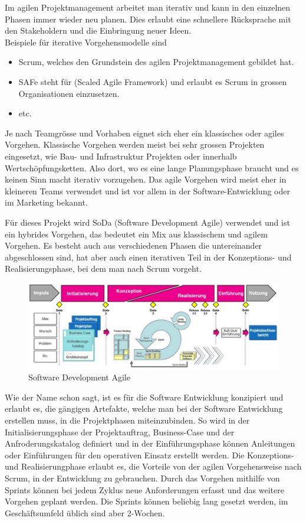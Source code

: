 \documentclass[a4paper, table]{article}
\begin{document}
Im agilen Projektmanagement arbeitet man iterativ und kann in den einzelnen Phasen immer wieder neu planen.
Dies erlaubt eine schnellere Rücksprache mit den Stakeholdern und die Einbringung neuer Ideen. \\
Beispiele für iterative Vorgehensmodelle sind
\begin{itemize}
    \item Scrum, welches den Grundstein des agilen Projektmanagement gebildet hat.
    \item SAFe steht für (Scaled Agile Framework) und erlaubt es Scrum in grossen Organisationen einzusetzen.
    \item etc. \autocite{noauthor_liste_2022}
\end{itemize}

Je nach Teamgrösse und Vorhaben eignet sich eher ein klassisches oder agiles Vorgehen.
Klassische Vorgehen werden meist bei sehr grossen Projekten eingesetzt, wie Bau- und Infrastruktur Projekten oder
innerhalb Wertschöpfungsketten. Also dort, wo es eine lange Planungsphase braucht und es keinen Sinn macht iterativ vorzugehen.
Das agile Vorgehen wird meist eher in kleineren Teams verwendet und ist vor allem in der Software-Entwicklung oder
im Marketing bekannt.
\newline

Für dieses Projekt wird SoDa (Software Development Agile) verwendet und ist ein hybrides Vorgehen,
das bedeutet ein Mix aus klassischem und agilem Vorgehen.
Es besteht auch aus verschiedenen Phasen die untereinander abgeschlossen sind,
hat aber auch einen iterativen Teil in der Konzeptions- und Realisierungsphase, bei dem man nach Scrum vorgeht.
\newpage

\begin{figure}[h]
    \centering
    \includegraphics[width=1.0\textwidth]{img/SoDa.png}
    \caption{Software Development Agile}
    \label{fig:SoDa}
\end{figure}


Wie der Name schon sagt, ist es für die Software Entwicklung konzipiert und erlaubt es, die gängigen Artefakte,
welche man bei der Software Entwicklung erstellen muss, in die Projektphasen miteinzubinden.
So wird in der Initialisierungsphase der Projektauftrag, Business-Case und der Anfroderungskatalog definiert und
in der Einführungsphase können Anleitungen oder Einführungen für den operativen Einsatz erstellt werden.
Die Konzeptions- und Realisierungphase erlaubt es, die Vorteile von der agilen Vorgehensweise nach Scrum,
in der Entwicklung zu gebrauchen. Durch das Vorgehen mithilfe von Sprints können bei jedem Zyklus neue
Anforderungen erfasst und das weitere Vorgehen geplant werden. Die Sprints können beliebig lang gesetzt werden,
im Geschäftsumfeld üblich sind aber 2-Wochen.
\end{document}
